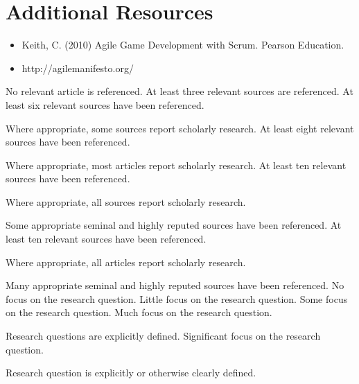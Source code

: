 \documentclass{../fal_assignment}
\begin{document}
\section*{Additional Resources}

\begin{itemize}
    \item Keith, C. (2010) Agile Game Development with Scrum. Pearson Education.
    \item http://agilemanifesto.org/
\end{itemize}

\begin{markingrubric}
%
%
        \grade\fail 	No relevant article is referenced.
        \grade 		At least three relevant sources are referenced.
        \grade 		At least six relevant sources have been referenced.
        \par		Where appropriate, some sources report scholarly research.
        \grade 		At least eight relevant sources have been referenced.
        \par		Where appropriate, most articles report scholarly research.
        \grade 		At least ten relevant sources have been referenced.
        \par		Where appropriate, all sources report scholarly research.
        \par		Some appropriate seminal and highly reputed sources have been referenced.      
        \grade 		At least ten relevant sources have been referenced.
        \par		Where appropriate, all articles report scholarly research.
        \par		Many appropriate seminal and highly reputed sources have been referenced.   
%
        \grade\fail 	No focus on the research question.
        \grade 		Little focus on the research question.
        \grade 		Some focus on the research question.
        \grade 		Much focus on the research question.
            \par 		Research questions are explicitly defined.
        \grade 		Significant focus on the research question.
            \par 		Research question is explicitly or otherwise clearly defined.

\end{markingrubric}
\end{document}
